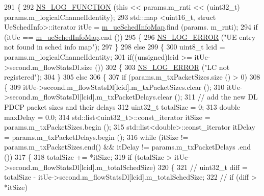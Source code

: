 \begin{DoxyCode}
291 \{
292   \hyperlink{log-macros-disabled_8h_a90b90d5bad1f39cb1b64923ea94c0761}{NS\_LOG\_FUNCTION} (\textcolor{keyword}{this} << params.m\_rnti << (uint32\_t) params.m\_logicalChannelIdentity);
293   std::map <uint16\_t, struct UeSchedInfo>::iterator itUe = \hyperlink{classns3_1_1MmWaveFlexTtiPfMacScheduler_a3b6dd19d8156d24c8d30cc562843b740}{m\_ueSchedInfoMap}.find (params.
      m\_rnti);
294   \textcolor{keywordflow}{if} (itUe == \hyperlink{classns3_1_1MmWaveFlexTtiPfMacScheduler_a3b6dd19d8156d24c8d30cc562843b740}{m\_ueSchedInfoMap}.end ())
295   \{
296         \hyperlink{group__logging_ga0261a8db1d4ac5f79417d117634fd455}{NS\_LOG\_ERROR} (\textcolor{stringliteral}{"UE entry not found in sched info map"});
297   \}
298   \textcolor{keywordflow}{else}
299   \{
300         uint8\_t lcid = params.m\_logicalChannelIdentity;
301         \textcolor{keywordflow}{if}((\textcolor{keywordtype}{unsigned})lcid >= itUe->second.m\_flowStatsDl.size ())
302         \{
303                 \hyperlink{group__logging_ga0261a8db1d4ac5f79417d117634fd455}{NS\_LOG\_ERROR} (\textcolor{stringliteral}{"LC not registered"});
304         \}
305         \textcolor{keywordflow}{else}
306         \{
307                 \textcolor{keywordflow}{if} (params.m\_txPacketSizes.size () > 0)
308                 \{
309                         itUe->second.m\_flowStatsDl[lcid].m\_txPacketSizes.clear ();
310                         itUe->second.m\_flowStatsDl[lcid].m\_txPacketDelays.clear ();
311                         \textcolor{comment}{// add the new DL PDCP packet sizes and their delays}
312                         uint32\_t totalSize = 0;
313                         \textcolor{keywordtype}{double} maxDelay = 0.0;
314                         std::list<uint32\_t>::const\_iterator itSize = params.m\_txPacketSizes.begin ();
315                         std::list<double>::const\_iterator itDelay = params.m\_txPacketDelays.begin ();
316                         \textcolor{keywordflow}{while} (itSize != params.m\_txPacketSizes.end() && itDelay != params.m\_txPacketDelays
      .end ())
317                         \{
318                                 totalSize += *itSize;
319                                 \textcolor{keywordflow}{if} (totalSize > itUe->second.m\_flowStatsDl[lcid].m\_totalSchedSize)
320                                 \{
321 \textcolor{comment}{//                                      uint32\_t diff = totalSize -
       itUe->second.m\_flowStatsDl[lcid].m\_totalSchedSize;}
322 \textcolor{comment}{//                                      if (diff > *itSize)}

\end{DoxyCode}
